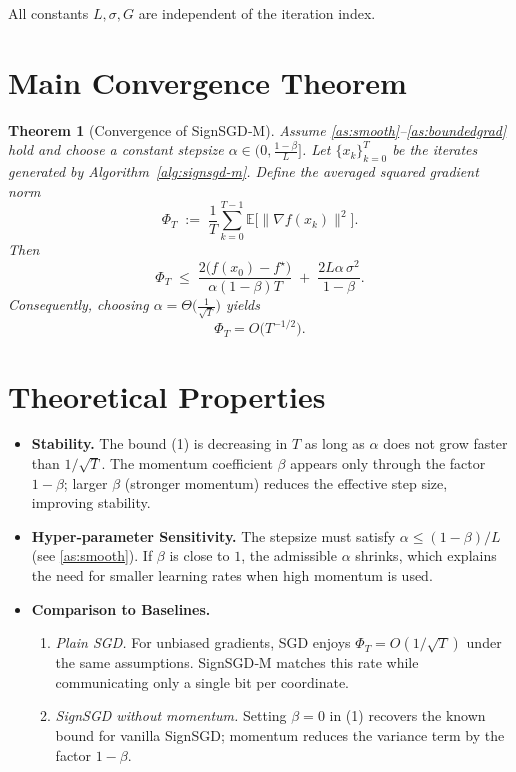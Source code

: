 \documentclass{article}
\newtheorem{theorem}{Theorem}
\newcommand{\E}{\mathbb{E}}
\begin{document}
All constants $L,\sigma,G$ are independent of the iteration index.

\section*{Main Convergence Theorem}
\begin{theorem}[Convergence of SignSGD‑M]\label{thm:main}
Assume \ref{as:smooth}–\ref{as:boundedgrad} hold and choose a constant stepsize 
$\alpha\in\bigl(0,\frac{1-\beta}{L}\bigr]$.  
Let $\{x_{k}\}_{k=0}^{T}$ be the iterates generated by Algorithm~\ref{alg:signsgd-m}.  
Define the averaged squared gradient norm
\[
\Phi_{T}\;:=\;\frac{1}{T}\sum_{k=0}^{T-1}\E\bigl[\|\nabla f(x_{k})\|^{2}\bigr].
\]
Then
\[
\Phi_{T}\;\le\;
\frac{2\bigl(f(x_{0})-f^{\star}\bigr)}{\alpha(1-\beta)T}
\;+\;
\frac{2L\alpha\,\sigma^{2}}{1-\beta}.
\tag{1}
\]
Consequently, choosing $\alpha = \Theta\!\bigl(\tfrac{1}{\sqrt{T}}\bigr)$ yields 
\[
\Phi_{T}=O\!\bigl(T^{-1/2}\bigr).
\]
\end{theorem}

\section*{Theoretical Properties}
\begin{itemize}
\item \textbf{Stability.} The bound (1) is decreasing in $T$ as long as $\alpha$ does not grow faster than $1/\sqrt{T}$. The momentum coefficient $\beta$ appears only through the factor $1-\beta$; larger $\beta$ (stronger momentum) reduces the effective step size, improving stability.
\item \textbf{Hyper‑parameter Sensitivity.} The stepsize must satisfy $\alpha\le (1-\beta)/L$ (see \ref{as:smooth}). If $\beta$ is close to $1$, the admissible $\alpha$ shrinks, which explains the need for smaller learning rates when high momentum is used.
\item \textbf{Comparison to Baselines.}
    \begin{enumerate}[label=(\alph*)]
        \item \emph{Plain SGD.} For unbiased gradients, SGD enjoys $\Phi_{T}=O(1/\sqrt{T})$ under the same assumptions. SignSGD‑M matches this rate while communicating only a single bit per coordinate.
        \item \emph{SignSGD without momentum.} Setting $\beta=0$ in (1) recovers the known bound for vanilla SignSGD; momentum reduces the variance term by the factor $1-\beta$.
    \end{enumerate}
\end{itemize}
\end{document}
